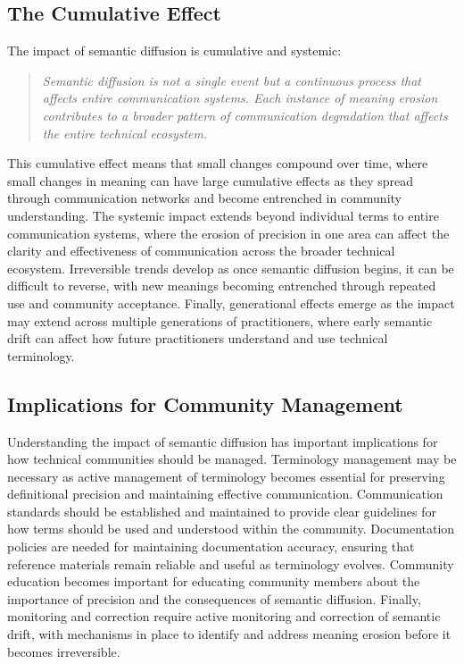 \documentclass[11pt]{article}
\begin{document}
\subsection{The Cumulative Effect}

The impact of semantic diffusion is cumulative and systemic:

\begin{quote}
\emph{Semantic diffusion is not a single event but a continuous process that affects entire communication systems. Each instance of meaning erosion contributes to a broader pattern of communication degradation that affects the entire technical ecosystem.}
\end{quote}

This cumulative effect means that small changes compound over time, where small changes in meaning can have large cumulative effects as they spread through communication networks and become entrenched in community understanding. The systemic impact extends beyond individual terms to entire communication systems, where the erosion of precision in one area can affect the clarity and effectiveness of communication across the broader technical ecosystem. Irreversible trends develop as once semantic diffusion begins, it can be difficult to reverse, with new meanings becoming entrenched through repeated use and community acceptance. Finally, generational effects emerge as the impact may extend across multiple generations of practitioners, where early semantic drift can affect how future practitioners understand and use technical terminology.

\subsection{Implications for Community Management}

Understanding the impact of semantic diffusion has important implications for how technical communities should be managed. Terminology management may be necessary as active management of terminology becomes essential for preserving definitional precision and maintaining effective communication. Communication standards should be established and maintained to provide clear guidelines for how terms should be used and understood within the community. Documentation policies are needed for maintaining documentation accuracy, ensuring that reference materials remain reliable and useful as terminology evolves. Community education becomes important for educating community members about the importance of precision and the consequences of semantic diffusion. Finally, monitoring and correction require active monitoring and correction of semantic drift, with mechanisms in place to identify and address meaning erosion before it becomes irreversible.
\end{document}
